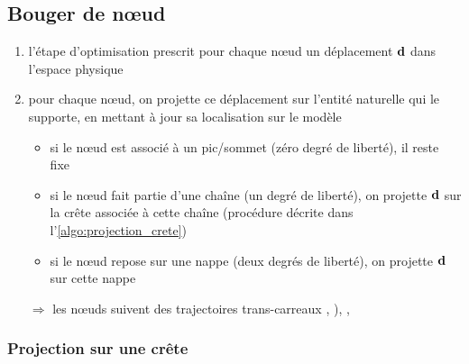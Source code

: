 \subsection{Bouger de n\oe ud}
\label{section:projection_surface_composite}
\begin{enumerate}
	\item l'étape d'optimisation prescrit pour chaque n\oe ud un déplacement $\mathbf{d}$ dans l'espace physique
	\item pour chaque n\oe ud, on projette ce déplacement sur l'entité naturelle qui le supporte, en mettant à jour sa localisation sur le modèle \brep
	\begin{itemize}
		\item si le n\oe ud est associé à un pic/sommet (zéro degré de liberté), il reste fixe 
		\item si le n\oe ud fait partie d'une chaîne (un degré de liberté), on projette $\mathbf{d}$ sur la crête associée à cette chaîne (procédure décrite dans l'\autoref{algo:projection_crete})
		\item si le n\oe ud repose sur une nappe (deux degrés de liberté), on projette $\mathbf{d}$ sur cette nappe
	\end{itemize}
	\item[$\Rightarrow$] les n\oe uds suivent des trajectoires trans-carreaux \cite{noel1995}, \cite[Section~5.5]{foucault2008}), \cite{thompson2005}, \cite[p.42 et Section~4.4.1]{crozet2017}
\end{enumerate}

\subsubsection{Projection sur une crête}

